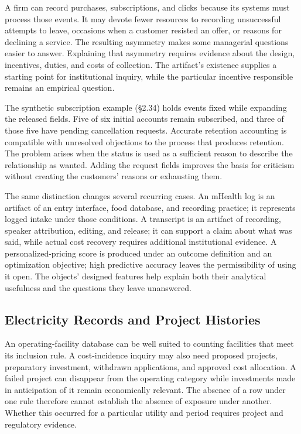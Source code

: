 \noindent A firm can record purchases, subscriptions, and clicks because its
systems must process those events. It may devote fewer resources to
recording unsuccessful attempts to leave, occasions when a customer
resisted an offer, or reasons for declining a service. The resulting
asymmetry makes some managerial questions easier to answer. Explaining
that asymmetry requires evidence about the design, incentives, duties,
and costs of collection. The artifact's existence supplies a starting
point for institutional inquiry, while the particular incentive
responsible remains an empirical question.

The synthetic subscription example (§2.34) holds events fixed while
expanding the released fields. Five of six initial accounts remain
subscribed, and three of those five have pending cancellation requests.
Accurate retention accounting is compatible with unresolved objections
to the process that produces retention. The problem arises when the
status is used as a sufficient reason to describe the relationship as
wanted. Adding the request fields improves the basis for criticism
without creating the customers' reasons or exhausting them.

The same distinction changes several recurring cases. An mHealth log is
an artifact of an entry interface, food database, and recording
practice; it represents logged intake under those conditions. A
transcript is an artifact of recording, speaker attribution, editing,
and release; it can support a claim about what was said, while actual
cost recovery requires additional institutional evidence. A
personalized-pricing score is produced under an outcome definition and
an optimization objective; high predictive accuracy leaves the
permissibility of using it open. The objects' designed features help
explain both their analytical usefulness and the questions they leave
unanswered.

\hypertarget{M09-electricity-records-and-project-histories}{%
\subsection{Electricity Records and Project
Histories}\label{M09-electricity-records-and-project-histories}}

\noindent An operating-facility database can be well suited to counting facilities
that meet its inclusion rule. A cost-incidence inquiry may also need
proposed projects, preparatory investment, withdrawn applications, and
approved cost allocation. A failed project can disappear from the
operating category while investments made in anticipation of it remain
economically relevant. The absence of a row under one rule therefore
cannot establish the absence of exposure under another. Whether this
occurred for a particular utility and period requires project and
regulatory evidence.

